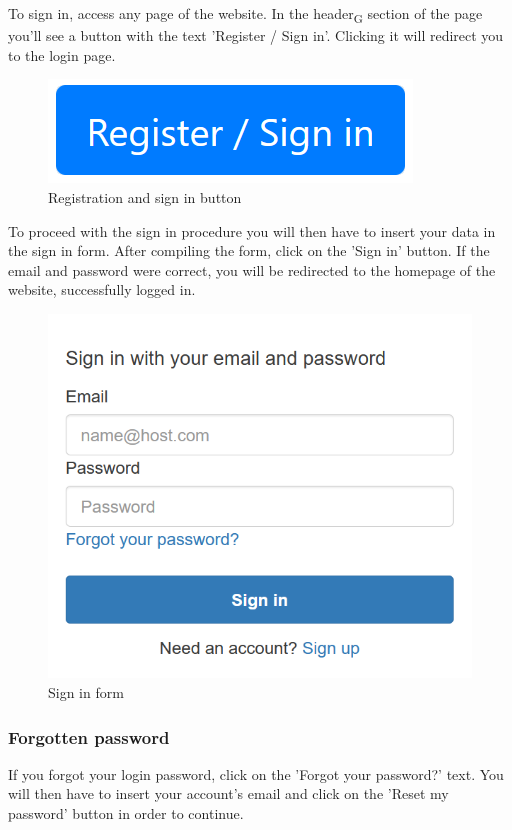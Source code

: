 To sign in, access any page of the website. In the header\textsubscript{G} section of the page you'll see a button with the text 'Register / Sign in'. Clicking it will redirect you to the login page.

\begin{figure}[H]
\centering
\includegraphics[scale=0.6]{res/Immagini/RegisterSigninButton}
\caption{Registration and sign in button}
\end{figure}

To proceed with the sign in procedure you will then have to insert your data in the sign in form. After compiling the form, click on the 'Sign in' button. If the email and password were correct, you will be redirected to the homepage of the website, successfully logged in.

\begin{figure}[H]
\centering
\includegraphics[scale=0.6]{res/Immagini/SigninForm}
\caption{Sign in form}
\end{figure}

\subsubsection{Forgotten password}
If you forgot your login password, click on the 'Forgot your password?' text. You will then have to insert your account's email and click on the 'Reset my password' button in order to continue.

